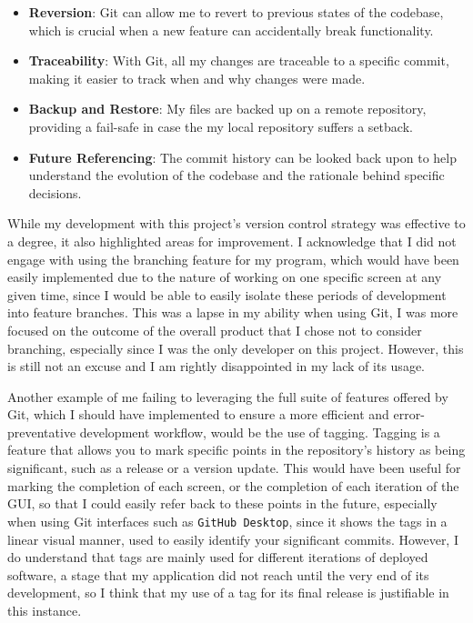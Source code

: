 \documentclass{article}
\begin{document}
\begin{itemize}
    \item \textbf{Reversion}: Git can allow me to revert to previous states of the codebase, which is crucial when a new feature can accidentally break functionality.
    \item \textbf{Traceability}: With Git, all my changes are traceable to a specific commit, making it easier to track when and why changes were made.
    \item \textbf{Backup and Restore}: My files are backed up on a remote repository, providing a fail-safe in case the my local repository suffers a setback.
    \item \textbf{Future Referencing}: The commit history can be looked back upon to help understand the evolution of the codebase and the rationale behind specific decisions.
\end{itemize}

While my development with this project's version control strategy was effective to a degree, it also highlighted areas for improvement. I acknowledge that I did not engage with using the branching feature for my program, which would have been easily implemented due to the nature of working on one specific screen at any given time, since I would be able to easily isolate these periods of development into feature branches. This was a lapse in my ability when using Git, I was more focused on the outcome of the overall product that I chose not to consider branching, especially since I was the only developer on this project. However, this is still not an excuse and I am rightly disappointed in my lack of its usage.\\\vspace{0.3cm}

Another example of me failing to leveraging the full suite of features offered by Git, which I should have implemented to ensure a more efficient and error-preventative development workflow, would be the use of tagging. Tagging is a feature that allows you to mark specific points in the repository's history as being significant, such as a release or a version update. This would have been useful for marking the completion of each screen, or the completion of each iteration of the GUI, so that I could easily refer back to these points in the future, especially when using Git interfaces such as \texttt{GitHub Desktop}, since it shows the tags in a linear visual manner, used to easily identify your significant commits. However, I do understand that tags are mainly used for different iterations of deployed software, a stage that my application did not reach until the very end of its development, so I think that my use of a tag for its final release is justifiable in this instance.\\\vspace{0.3cm}
\end{document}
